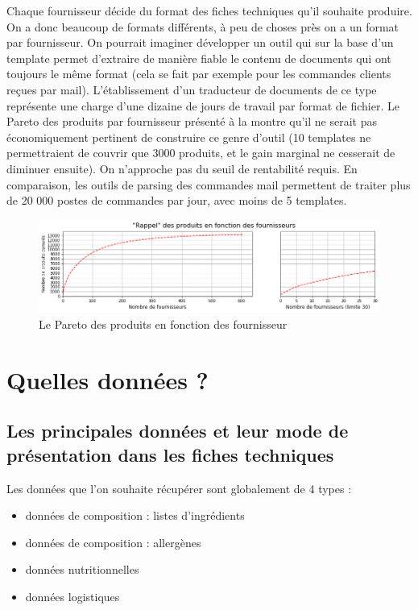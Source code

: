         Chaque fournisseur décide du format des fiches techniques qu'il souhaite produire.
        On a donc beaucoup de formats différents, à peu de choses près on a un format par fournisseur.
        On pourrait imaginer développer un outil qui sur la base d'un template permet d'extraire de manière fiable le contenu de documents qui ont toujours le même format (cela se fait par exemple pour les commandes clients reçues par mail).
        L'établissement d'un \og traducteur \fg de documents de ce type représente une charge d'une dizaine de jours de travail par format de fichier.
        Le Pareto des produits par fournisseur présenté à la  montre qu'il ne serait pas économiquement pertinent de construire ce genre d'outil (10 templates ne permettraient de couvrir que 3000 produits, et le gain marginal ne cesserait de diminuer ensuite).
        On n'approche pas du seuil de rentabilité requis. 
        En comparaison, les outils de parsing des commandes mail permettent de traiter plus de 20 000 postes de commandes par jour, avec moins de 5 templates.

        \begin{figure}[htbp]
            \begin{center}
            \includegraphics[width=\linewidth]{img/rappel_produit_par_fournisseur.png}
            \end{center}
            \caption{Le Pareto des produits en fonction des fournisseur}
            \label{fig:rappel_pdt_par_frn}
        \end{figure}


        \section{Quelles données ?}

            \subsection{Les principales données et leur mode de présentation dans les fiches techniques}
            Les données que l'on souhaite récupérer sont globalement de 4 types : 
            \begin{itemize}
                \item données de composition : listes d'ingrédients
                \item données de composition : allergènes
                \item données nutritionnelles
                \item données logistiques
            \end{itemize}

